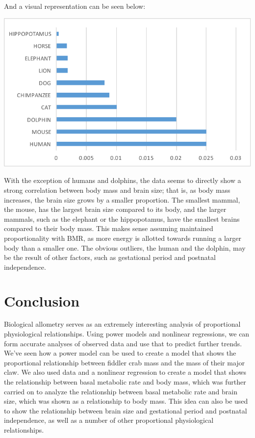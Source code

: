 \documentclass[10pt,letterpaper]{article}
\begin{document}
			And a visual representation can be seen below:
			\newline \newline
			\centerline{\includegraphics{Picture10.pdf}}
			\newline \newline
			With the exception of humans and dolphins, the data seems to directly show a strong correlation between body mass and brain size; that is, as body mass increases, the brain size grows by a smaller proportion. The smallest mammal, the mouse, has the largest brain size compared to its body, and the larger mammals, such as the elephant or the hippopotamus, have the smallest brains compared to their body mass. This makes sense assuming maintained proportionality with BMR, as more energy is allotted towards running a larger body than a smaller one. The obvious outliers, the human and the dolphin, may be the result of other factors, such as gestational period and postnatal independence. 
	\section{Conclusion}
		Biological allometry serves as an extremely interesting analysis of proportional physiological relationships. Using power models and nonlinear regressions, we can form accurate analyses of observed data and use that to predict further trends. We've seen how a power model can be used to create a model that shows the proportional relationship between fiddler crab mass and the mass of their major claw. We also used data and a nonlinear regression to create a model that shows the relationship between basal metabolic rate and body mass, which was further carried on to analyze the relationship between basal metabolic rate and brain size, which was shown as a relationship to body mass. This idea can also be used to show the relationship between brain size and gestational period and postnatal independence, as well as a number of other proportional physiological relationships.
\end{document}
